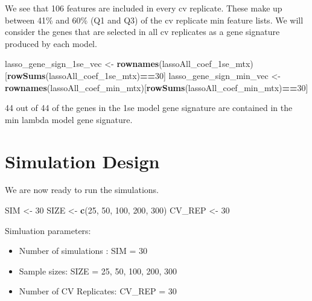 \documentclass[
]{book}
\newenvironment{Shaded}{\begin{snugshade}}{\end{snugshade}}
\newcommand{\DecValTok}[1]{\textcolor[rgb]{0.00,0.00,0.81}{#1}}
\newcommand{\KeywordTok}[1]{\textcolor[rgb]{0.13,0.29,0.53}{\textbf{#1}}}
\newcommand{\NormalTok}[1]{#1}
\newcommand{\OperatorTok}[1]{\textcolor[rgb]{0.81,0.36,0.00}{\textbf{#1}}}
\newcommand{\StringTok}[1]{\textcolor[rgb]{0.31,0.60,0.02}{#1}}
\begin{document}
We see that 106 features are included in every
cv replicate. These make up between
41\%
and
60\%
(Q1 and Q3) of the cv replicate min feature lists.
We will consider the genes that are selected in all cv replicates as a
gene signature produced by each model.

\begin{Shaded}
\begin{Highlighting}[]
\NormalTok{lasso\_gene\_sign\_1se\_vec <{-}}\StringTok{ }\KeywordTok{rownames}\NormalTok{(lassoAll\_coef\_1se\_mtx)[}\KeywordTok{rowSums}\NormalTok{(lassoAll\_coef\_1se\_mtx)}\OperatorTok{==}\DecValTok{30}\NormalTok{]}
\NormalTok{lasso\_gene\_sign\_min\_vec <{-}}\StringTok{ }\KeywordTok{rownames}\NormalTok{(lassoAll\_coef\_min\_mtx)[}\KeywordTok{rowSums}\NormalTok{(lassoAll\_coef\_min\_mtx)}\OperatorTok{==}\DecValTok{30}\NormalTok{]}
\end{Highlighting}
\end{Shaded}

44 out of
44 of the genes in the 1se model gene signature
are contained in the min lambda model gene signature.

\hypertarget{simulation-design}{%
\section{Simulation Design}\label{simulation-design}}

We are now ready to run the simulations.

\begin{Shaded}
\begin{Highlighting}[]
\NormalTok{ SIM <{-}}\StringTok{ }\DecValTok{30}
\NormalTok{ SIZE <{-}}\StringTok{ }\KeywordTok{c}\NormalTok{(}\DecValTok{25}\NormalTok{, }\DecValTok{50}\NormalTok{, }\DecValTok{100}\NormalTok{, }\DecValTok{200}\NormalTok{, }\DecValTok{300}\NormalTok{)}
\NormalTok{ CV\_REP <{-}}\StringTok{ }\DecValTok{30}
\end{Highlighting}
\end{Shaded}

Simluation parameters:

\begin{itemize}
\item
  Number of simulations : SIM = 30
\item
  Sample sizes: SIZE = 25, 50, 100, 200, 300
\item
  Number of CV Replicates: CV\_REP = 30
\end{itemize}
\end{document}
